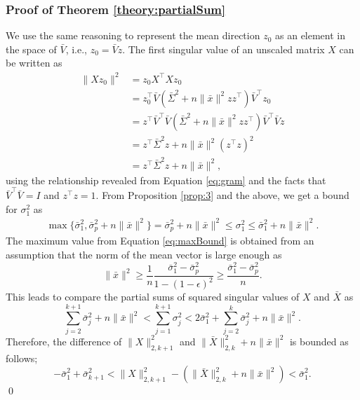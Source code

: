 \documentclass[11pt]{article}
\begin{document}
\subsubsection*{Proof of Theorem \ref{theory:partialSum}}
We use the same reasoning to represent the mean direction $z_0$ as an element in the space of $\bar{V}$, i.e., $z_0 = \bar{V}z$. The first singular value of an unscaled matrix $X$ can be written as 
\begin{equation*}
	\begin{aligned}
		\|Xz_0\|^2 &= z_0 X^\top X z_0\\
		&= z_0^\top \bar{V} ( \bar{\Sigma}^2 + n\|\bar{x}\|^2 zz^\top )\bar{V}^\top z_0\\
		&= z^\top \bar{V}^\top \bar{V} ( \bar{\Sigma}^2 + n\|\bar{x}\|^2 zz^\top )\bar{V}^\top \bar{V} z\\
		&= z^\top \bar{\Sigma}^2 z + n \|\bar{x}\|^2 (z^\top z)^2\\
		&= z^\top \bar{\Sigma}^2 z + n \|\bar{x}\|^2,
	\end{aligned}
\end{equation*}
using the relationship revealed from Equation \eqref{eq:gram} and the facts that $\bar{V}^\top \bar{V} = I$ and $z^\top z = 1$. From Proposition \ref{prop:3} and the above, we get a bound for $\sigma_1^2$ as
\begin{eqnarray}\label{eq:maxBound}
	\max\lbrace\bar{\sigma}_1^2, \bar{\sigma}_p^2 + n\|\bar{x}\|^2\rbrace =  \bar{\sigma}_p^2 + n\|\bar{x}\|^2 \leq \sigma_1^2 \leq \bar{\sigma}_1^2 + n\|\bar{x}\|^2.
\end{eqnarray}
The maximum value from Equation \eqref{eq:maxBound} is obtained from an assumption that the norm of the mean vector is large enough as 
\begin{equation*}
	\|\bar{x}\|^2 \geq \frac{1}{n} \frac{\bar{\sigma}_1^2 - \bar{\sigma}_p^2}{1 - (1-\epsilon)^2} \geq \frac{\bar{\sigma}_1^2 - \bar{\sigma}_p^2}{n}.
\end{equation*}
This leads to compare the partial sums of squared singular values of $X$ and $\bar{X}$ as 
\begin{equation*}
\sum_{j=2}^{k+1} \bar{\sigma}_j^2 + n \|\bar{x}\|^2 < \sum_{j=1}^{k+1} \sigma_j^2 < 2 \bar{\sigma}_1^2 + \sum_{j=2}^k \bar{\sigma}_j^2 + n \|\bar{x}\|^2. 
\end{equation*}
Therefore, the difference of $\|X\|_{2,k+1}^2$ and $\|\bar{X}\|_{2,k}^2 + n \|\bar{x}\|^2$ is bounded as follows;
\begin{equation*}
- \bar{\sigma}_1^2 + \bar{\sigma}_{k+1}^2 < \|X\|_{2,k+1}^2 - (\|\bar{X}\|_{2,k}^2 + n \|\bar{x}\|^2) < \bar{\sigma}_1^2.
\end{equation*}\qed 
\end{document}
